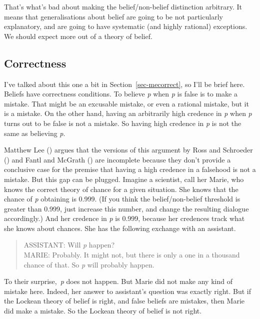 \documentclass[
  10pt,
  letterpaper,
  twoside]{scrbook}
\begin{document}
That's what's bad about making the belief/non-belief distinction
arbitrary. It means that generalisations about belief are going to be
not particularly explanatory, and are going to have systematic (and
highly rational) exceptions. We should expect more out of a theory of
belief.

\subsection{Correctness}\label{sec-lockecorrect}

I've talked about this one a bit in Section~\ref{sec-mecorrect}, so I'll
be brief here. Beliefs have correctness conditions. To believe \emph{p}
when \emph{p} is false is to make a mistake. That might be an excusable
mistake, or even a rational mistake, but it is a mistake. On the other
hand, having an arbitrarily high credence in \emph{p} when \emph{p}
turns out to be false is not a mistake. So having high credence in
\emph{p} is not the same as believing \emph{p}.

Matthew Lee () argues that the versions of
this argument by Ross and Schroeder
() and Fantl and McGrath
() are incomplete because they
don't provide a conclusive case for the premise that having a high
credence in a falsehood is not a mistake. But this gap can be plugged.
Imagine a scientist, call her Marie, who knows the correct theory of
chance for a given situation. She knows that the chance of \emph{p}
obtaining is 0.999. (If you think the belief/non-belief threshold is
greater than 0.999, just increase this number, and change the resulting
dialogue accordingly.) And her credence in \emph{p} is 0.999, because
her credences track what she knows about chances. She has the following
exchange with an assistant.

\begin{quote}
ASSISTANT: Will \emph{p} happen?\\
MARIE: Probably. It might not, but there is only a one in a thousand
chance of that. So \emph{p} will probably happen.
\end{quote}

To their surprise,~\emph{p} does not happen. But Marie did not make any
kind of mistake here. Indeed, her answer to assistant's question was
exactly right. But if the Lockean theory of belief is right, and false
beliefs are mistakes, then Marie did make a mistake. So the Lockean
theory of belief is not right.
\end{document}
